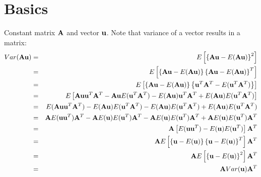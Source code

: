 \documentclass[11pt]{article}
\theoremstyle{remark}
\begin{document}
\section{Basics}
Constant matrix $\bold{A}$ and vector $\bold{u}$. Note that variance of a vector results in a matrix:
\begin{eqnarray}
Var(\bold{A}\bold{u}) &=& E\left[ \left\{  \bold{A}\bold{u}-E(\bold{A}\bold{u})  \right\}^2 \right]\nonumber\\
&=& E\left[ \left\{  \bold{A}\bold{u}-E(\bold{A}\bold{u})  \right\} \left\{ \bold{A}\bold{u}-E(\bold{A}\bold{u})  \right\}^T \right]\nonumber\\
&=& E\left[ \left\{  \bold{A}\bold{u}-E(\bold{A}\bold{u})  \right\} \left\{  \bold{u}^T\bold{A}^T-E(\bold{u}^T\bold{A}^T)  \right\} \right]\nonumber\\
&=& E\left[ \bold{A}\bold{u} \bold{u}^T\bold{A}^T - \bold{A}\bold{u} E(\bold{u}^T\bold{A}^T) -E(\bold{A}\bold{u})\bold{u}^T\bold{A}^T + E(\bold{A}\bold{u}) E(\bold{u}^T\bold{A}^T) \right]\nonumber\\
&=& E(\bold{A}\bold{u} \bold{u}^T\bold{A}^T) - E(\bold{A}\bold{u}) E(\bold{u}^T\bold{A}^T) -E(\bold{A}\bold{u})E(\bold{u}^T\bold{A}^T) + E(\bold{A}\bold{u}) E(\bold{u}^T\bold{A}^T)\nonumber\\
&=& \bold{A}E(\bold{u} \bold{u}^T)\bold{A}^T - \bold{A}E(\bold{u}) E(\bold{u}^T)\bold{A}^T - \bold{A}E(\bold{u})E(\bold{u}^T)\bold{A}^T + \bold{A}E(\bold{u}) E(\bold{u}^T)\bold{A}^T\nonumber\\
&=& \bold{A} \left[ E(\bold{u} \bold{u}^T) - E(\bold{u}) E(\bold{u}^T) \right]\bold{A}^T \nonumber\\
&=& \bold{A} E\left[ \left\{ \bold{u} - E(\bold{u}) \right\} \left\{ \bold{u} - E(\bold{u}) \right\}^T \right]\bold{A}^T \nonumber\\
&=& \bold{A} E\left[ \left\{ \bold{u} - E(\bold{u}) \right\}^2 \right]\bold{A}^T \nonumber\\
&=& \bold{A} Var(\bold{u}) \bold{A}^T
\label{VarianceProdConstantMatrix}
\end{eqnarray}

\clearpage
\end{document}
